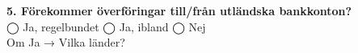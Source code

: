 \documentclass[10pt]{beamer}
\begin{document}
\begin{frame}[label=riskfragor-steg4]
  \vspace{0.3cm}

  \textbf{5. Förekommer överföringar till/från utländska bankkonton?}\\
  ◯ Ja, regelbundet \hspace{0.3cm} ◯ Ja, ibland \hspace{0.3cm} ◯ Nej\\
  Om Ja → Vilka länder? \underline{\hspace{5cm}}

  \vspace{0.5cm}
  \begin{flushright}
    \hyperlink{riskfragor-steg3}{} \hspace{0.3cm} \hyperlink{riskfragor-steg5}{}
  \end{flushright}
\end{frame}
\end{document}
